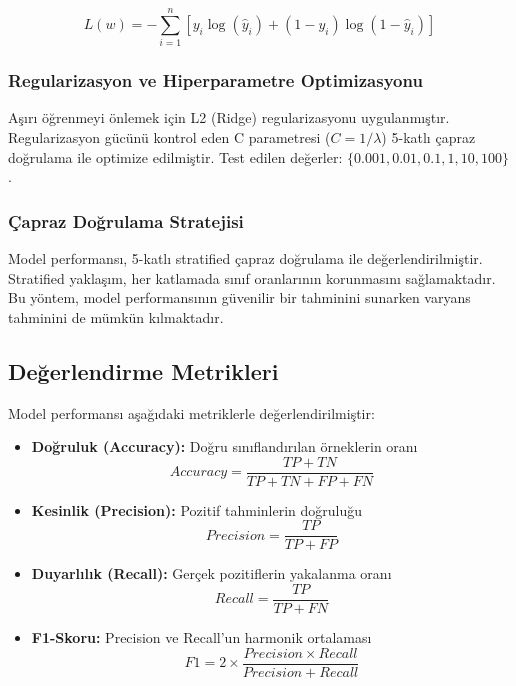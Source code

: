 \documentclass[conference]{IEEEtran}
\begin{document}
\begin{equation}
    L(w) = -\sum_{i=1}^{n} [y_i \log(\hat{y}_i) + (1-y_i) \log(1-\hat{y}_i)]
\end{equation}

\subsubsection{Regularizasyon ve Hiperparametre Optimizasyonu}

Aşırı öğrenmeyi önlemek için L2 (Ridge) regularizasyonu uygulanmıştır. Regularizasyon gücünü kontrol eden C parametresi ($C = 1/\lambda$) 5-katlı çapraz doğrulama ile optimize edilmiştir. Test edilen değerler: $\{0.001, 0.01, 0.1, 1, 10, 100\}$.

\subsubsection{Çapraz Doğrulama Stratejisi}

Model performansı, 5-katlı stratified çapraz doğrulama ile değerlendirilmiştir. Stratified yaklaşım, her katlamada sınıf oranlarının korunmasını sağlamaktadır. Bu yöntem, model performansının güvenilir bir tahminini sunarken varyans tahminini de mümkün kılmaktadır.

\subsection{Değerlendirme Metrikleri}

Model performansı aşağıdaki metriklerle değerlendirilmiştir:

\begin{itemize}
    \item \textbf{Doğruluk (Accuracy):} Doğru sınıflandırılan örneklerin oranı
    \begin{equation}
        Accuracy = \frac{TP + TN}{TP + TN + FP + FN}
    \end{equation}
    
    \item \textbf{Kesinlik (Precision):} Pozitif tahminlerin doğruluğu
    \begin{equation}
        Precision = \frac{TP}{TP + FP}
    \end{equation}
    
    \item \textbf{Duyarlılık (Recall):} Gerçek pozitiflerin yakalanma oranı
    \begin{equation}
        Recall = \frac{TP}{TP + FN}
    \end{equation}
    
    \item \textbf{F1-Skoru:} Precision ve Recall'un harmonik ortalaması
    \begin{equation}
        F1 = 2 \times \frac{Precision \times Recall}{Precision + Recall}
    \end{equation}
\end{itemize}
\end{document}
